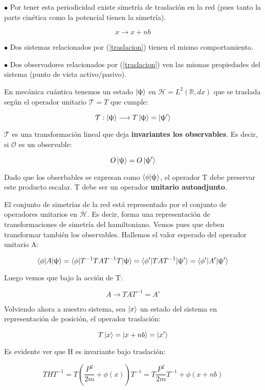 \documentclass{article}
\begin{document}
\smallskip
$\bullet$ Por tener esta periodicidad existe simetría de traslación en la red (pues tanto la parte cinética como la potencial tienen la simetría).

\begin{equation}
    x\longrightarrow x+nb
    \label{traslacion}
\end{equation}

\smallskip
$\bullet$ Dos sistemas relacionados por (\ref{traslacion}) tienen el mismo comportamiento.

\smallskip
$\bullet$ Dos observadores relacionados por (\ref{traslacion}) ven las mismas propiedades del sistema (punto de vista activo/pasivo).

En mecánica cuántica tenemos un estado $\ket{\uppsi}$ en $\mathcal{H}=L^2(\mathds{R},dx)$ que se traslada según el operador unitario $\mathcal{T}=T$ que cumple:

$$\mathcal{T}: \ket{\uppsi}\longrightarrow T\ket{\uppsi}=\ket{\uppsi '}$$

$\mathcal{T}$ es una transformación lineal que deja \textbf{invariantes los observables}. Es decir, si $\mathcal{O}$ es un observable:

$$O\ket{\uppsi}=O\ket{\uppsi '}$$

Dado que los obserbables se expresan como $\braket{\phi|\uppsi}$, el operador T debe preservar este producto escalar. T debe ser un operador \textbf{unitario autoadjunto}.

El conjunto de simetrías de la red está representado por el conjunto de operadores unitarios en $\mathcal{H}$. Es decir, forma una representación de transformaciones de simetría del hamiltoniano. Vemos pues que deben transformar también los observables. Hallemos el valor esperado del operador unitario A:

$$\braket{\phi |A|\uppsi}=\braket{\phi |T^{-1}TAT^{-1}T|\uppsi}=\braket{\phi '|TAT^{-1}|\uppsi '}=\braket{\phi '|A'|\uppsi'}$$

Luego vemos que bajo la acción de T:

$$A\longrightarrow TAT^{-1}=A'$$

Volviendo ahora a nuestro sistema, sea $\ket{x}$ un estado del sistema en representación de posición, el operador traslación:

$$T\ket{x}=\ket{x+nb}=\ket{x'}$$

Es evidente ver que H es invariante bajo traslación:

$$THT^{-1}=T\left( \frac{P^2}{2m}+\phi (x)\right)T^{-1}=T \frac{P^2}{2m}T^{-1}+\phi (x+nb)$$
\end{document}
